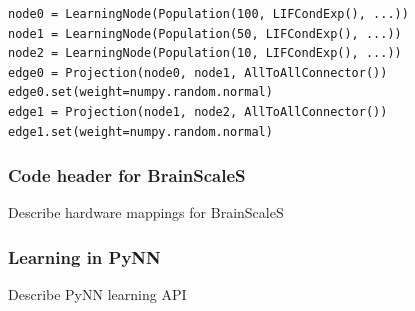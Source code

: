 \begin{lstlisting}
node0 = LearningNode(Population(100, LIFCondExp(), ...))
node1 = LearningNode(Population(50, LIFCondExp(), ...))
node2 = LearningNode(Population(10, LIFCondExp(), ...))
edge0 = Projection(node0, node1, AllToAllConnector())
edge0.set(weight=numpy.random.normal)
edge1 = Projection(node1, node2, AllToAllConnector())
edge1.set(weight=numpy.random.normal)
\end{lstlisting}

\subsubsection{Code header for BrainScaleS} \label{ref:Cairo}
Describe hardware mappings for BrainScaleS

\subsubsection{Learning in PyNN}
\label{ref:PyNN-augmentation}
Describe PyNN learning API
